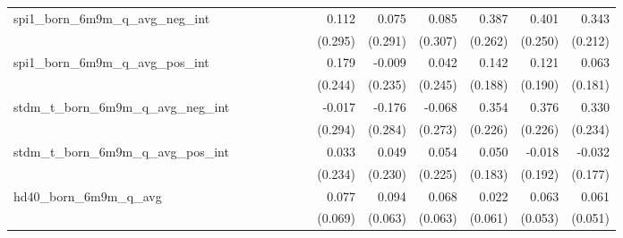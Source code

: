 \begin{tabular}{lrrrrrrrrrrrr}
spi1\_born\_6m9m\_q\_avg\_neg\_int          &              &              &              &              &              &              &        0.112 &        0.075 &        0.085 &        0.387 &        0.401 &        0.343 \\ 
                                            &              &              &              &              &              &              &      (0.295) &      (0.291) &      (0.307) &      (0.262) &      (0.250) &      (0.212) \\ 
spi1\_born\_6m9m\_q\_avg\_pos\_int          &              &              &              &              &              &              &        0.179 &       -0.009 &        0.042 &        0.142 &        0.121 &        0.063 \\ 
                                            &              &              &              &              &              &              &      (0.244) &      (0.235) &      (0.245) &      (0.188) &      (0.190) &      (0.181) \\ 
stdm\_t\_born\_6m9m\_q\_avg\_neg\_int       &              &              &              &              &              &              &       -0.017 &       -0.176 &       -0.068 &        0.354 &        0.376 &        0.330 \\ 
                                            &              &              &              &              &              &              &      (0.294) &      (0.284) &      (0.273) &      (0.226) &      (0.226) &      (0.234) \\ 
stdm\_t\_born\_6m9m\_q\_avg\_pos\_int       &              &              &              &              &              &              &        0.033 &        0.049 &        0.054 &        0.050 &       -0.018 &       -0.032 \\ 
                                            &              &              &              &              &              &              &      (0.234) &      (0.230) &      (0.225) &      (0.183) &      (0.192) &      (0.177) \\ 
hd40\_born\_6m9m\_q\_avg                    &              &              &              &              &              &              &        0.077 &        0.094 &        0.068 &        0.022 &        0.063 &        0.061 \\ 
                                            &              &              &              &              &              &              &      (0.069) &      (0.063) &      (0.063) &      (0.061) &      (0.053) &      (0.051) \\ 

\end{tabular}
